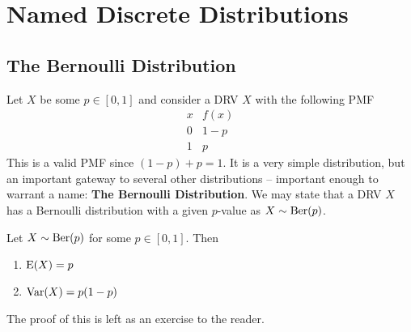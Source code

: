 \section{Named Discrete Distributions}
\subsection{The Bernoulli Distribution}
\newcommand{\ber}{\textup{Ber}}
Let $X$ be some $p\in[0,1]$ and consider a DRV $X$ with the following PMF
\[
    \begin{array}{c|c}
         x & f(x) \\
         \hline
         0 & 1-p \\
         1 & p
    \end{array}
\]
This is a valid PMF since $(1-p)+p=1$. It is a very simple distribution, but an important gateway to several other distributions -- important enough to warrant a name: \textbf{The Bernoulli Distribution}. We may state that a DRV $X$ has a Bernoulli distribution with a given $p$-value as $X\sim\ber(p)$.
\begin{theorem}
    Let $X\sim\ber(p)$ for some $p\in[0,1]$. Then
    \begin{enumerate}
        \item $\textup{E}(X)=p$
        \item $\textup{Var}(X)=p(1-p)$
    \end{enumerate}

    The proof of this is left as an exercise to the reader.
\end{theorem}
\label{thm:propsbin}
